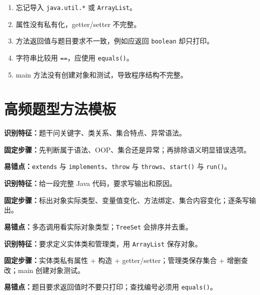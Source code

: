 \documentclass[UTF8,zihao=-4]{ctexart}
\begin{document}
\begin{warnbox}[程序设计扣分点]
\begin{enumerate}
  \item 忘记导入 \texttt{java.util.*} 或 \texttt{ArrayList}。
  \item 属性没有私有化，getter/setter 不完整。
  \item 方法返回值与题目要求不一致，例如应返回 \texttt{boolean} 却只打印。
  \item 字符串比较用 \texttt{==}，应使用 \texttt{equals()}。
  \item main 方法没有创建对象和测试，导致程序结构不完整。
\end{enumerate}
\end{warnbox}

\section{高频题型方法模板}

\begin{methodbox}
\textbf{识别特征：}题干问关键字、类关系、集合特点、异常语法。\par
\textbf{固定步骤：}先判断属于语法、OOP、集合还是异常；再排除语义明显错误选项。\par
\textbf{易错点：}\texttt{extends} 与 \texttt{implements}、\texttt{throw} 与 \texttt{throws}、\texttt{start()} 与 \texttt{run()}。
\end{methodbox}

\begin{methodbox}
\textbf{识别特征：}给一段完整 Java 代码，要求写输出和原因。\par
\textbf{固定步骤：}标出对象实际类型、变量值变化、方法绑定、集合内容变化；逐条写输出。\par
\textbf{易错点：}多态调用看实际对象类型；\texttt{TreeSet} 会排序并去重。
\end{methodbox}

\begin{methodbox}
\textbf{识别特征：}要求定义实体类和管理类，用 \texttt{ArrayList} 保存对象。\par
\textbf{固定步骤：}实体类私有属性 + 构造 + getter/setter；管理类保存集合 + 增删查改；main 创建对象测试。\par
\textbf{易错点：}题目要求返回值时不要只打印；查找编号必须用 \texttt{equals()}。
\end{methodbox}
\end{document}
